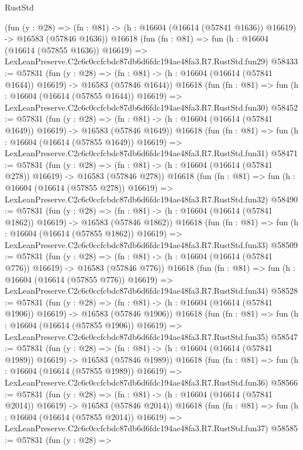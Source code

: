 \begin{lexlean}{RustStd}
\begin{coremodule}
    (fun (y : @28) =>
    (fn : @81) -> (h : @16604 (@16614 (@57841 @1636)) @16619) -> @16583 (@57846 @1636))
    @16618
    (fun (fn : @81) =>
    fun (h : @16604 (@16614 (@57855 @1636)) @16619) =>
    LexLeanPreserve.C2c6c0ccfcbdc87db6d6fdc194ae48fa3.R7.RustStd.fun29)
@58433 := @57831
    (fun (y : @28) =>
    (fn : @81) -> (h : @16604 (@16614 (@57841 @1644)) @16619) -> @16583 (@57846 @1644))
    @16618
    (fun (fn : @81) =>
    fun (h : @16604 (@16614 (@57855 @1644)) @16619) =>
    LexLeanPreserve.C2c6c0ccfcbdc87db6d6fdc194ae48fa3.R7.RustStd.fun30)
@58452 := @57831
    (fun (y : @28) =>
    (fn : @81) -> (h : @16604 (@16614 (@57841 @1649)) @16619) -> @16583 (@57846 @1649))
    @16618
    (fun (fn : @81) =>
    fun (h : @16604 (@16614 (@57855 @1649)) @16619) =>
    LexLeanPreserve.C2c6c0ccfcbdc87db6d6fdc194ae48fa3.R7.RustStd.fun31)
@58471 := @57831
    (fun (y : @28) =>
    (fn : @81) -> (h : @16604 (@16614 (@57841 @278)) @16619) -> @16583 (@57846 @278))
    @16618
    (fun (fn : @81) =>
    fun (h : @16604 (@16614 (@57855 @278)) @16619) =>
    LexLeanPreserve.C2c6c0ccfcbdc87db6d6fdc194ae48fa3.R7.RustStd.fun32)
@58490 := @57831
    (fun (y : @28) =>
    (fn : @81) -> (h : @16604 (@16614 (@57841 @1862)) @16619) -> @16583 (@57846 @1862))
    @16618
    (fun (fn : @81) =>
    fun (h : @16604 (@16614 (@57855 @1862)) @16619) =>
    LexLeanPreserve.C2c6c0ccfcbdc87db6d6fdc194ae48fa3.R7.RustStd.fun33)
@58509 := @57831
    (fun (y : @28) =>
    (fn : @81) -> (h : @16604 (@16614 (@57841 @776)) @16619) -> @16583 (@57846 @776))
    @16618
    (fun (fn : @81) =>
    fun (h : @16604 (@16614 (@57855 @776)) @16619) =>
    LexLeanPreserve.C2c6c0ccfcbdc87db6d6fdc194ae48fa3.R7.RustStd.fun34)
@58528 := @57831
    (fun (y : @28) =>
    (fn : @81) -> (h : @16604 (@16614 (@57841 @1906)) @16619) -> @16583 (@57846 @1906))
    @16618
    (fun (fn : @81) =>
    fun (h : @16604 (@16614 (@57855 @1906)) @16619) =>
    LexLeanPreserve.C2c6c0ccfcbdc87db6d6fdc194ae48fa3.R7.RustStd.fun35)
@58547 := @57831
    (fun (y : @28) =>
    (fn : @81) -> (h : @16604 (@16614 (@57841 @1989)) @16619) -> @16583 (@57846 @1989))
    @16618
    (fun (fn : @81) =>
    fun (h : @16604 (@16614 (@57855 @1989)) @16619) =>
    LexLeanPreserve.C2c6c0ccfcbdc87db6d6fdc194ae48fa3.R7.RustStd.fun36)
@58566 := @57831
    (fun (y : @28) =>
    (fn : @81) -> (h : @16604 (@16614 (@57841 @2014)) @16619) -> @16583 (@57846 @2014))
    @16618
    (fun (fn : @81) =>
    fun (h : @16604 (@16614 (@57855 @2014)) @16619) =>
    LexLeanPreserve.C2c6c0ccfcbdc87db6d6fdc194ae48fa3.R7.RustStd.fun37)
@58585 := @57831
    (fun (y : @28) =>

\end{coremodule}
\end{lexlean}
